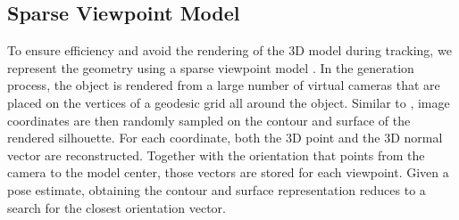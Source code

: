 \documentclass[10pt,twocolumn,letterpaper]{article}
\begin{document}
\subsection{Sparse Viewpoint Model}\label{ssec:p1}
To ensure efficiency and avoid the rendering of the 3D model during tracking, we represent the geometry using a sparse viewpoint model \cite{Stoiber2021}.
In the generation process, the object is rendered from a large number of virtual cameras that are placed on the vertices of a geodesic grid all around the object.
Similar to \cite{Tan2017}, image coordinates are then randomly sampled on the contour and surface of the rendered silhouette.
For each coordinate, both the 3D point  and the 3D normal vector  are reconstructed.
Together with the orientation that points from the camera to the model center, those vectors are stored for each viewpoint.
Given a pose estimate, obtaining the contour and surface representation reduces to a search for the closest orientation vector.
\end{document}
